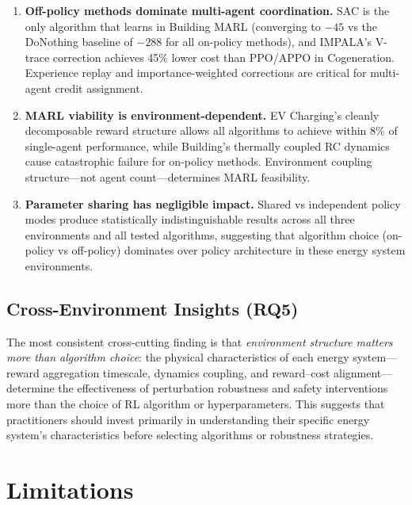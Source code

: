 \begin{enumerate}
    \item \textbf{Off-policy methods dominate multi-agent coordination.} SAC is the only algorithm that learns in Building MARL (converging to $-45$ vs the DoNothing baseline of $-288$ for all on-policy methods), and IMPALA's V-trace correction achieves 45\% lower cost than PPO/APPO in Cogeneration. Experience replay and importance-weighted corrections are critical for multi-agent credit assignment.

    \item \textbf{MARL viability is environment-dependent.} EV Charging's cleanly decomposable reward structure allows all algorithms to achieve within 8\% of single-agent performance, while Building's thermally coupled RC dynamics cause catastrophic failure for on-policy methods. Environment coupling structure---not agent count---determines MARL feasibility.

    \item \textbf{Parameter sharing has negligible impact.} Shared vs independent policy modes produce statistically indistinguishable results across all three environments and all tested algorithms, suggesting that algorithm choice (on-policy vs off-policy) dominates over policy architecture in these energy system environments.
\end{enumerate}

\subsection{Cross-Environment Insights (RQ5)}

The most consistent cross-cutting finding is that \emph{environment structure matters more than algorithm choice}: the physical characteristics of each energy system---reward aggregation timescale, dynamics coupling, and reward--cost alignment---determine the effectiveness of perturbation robustness and safety interventions more than the choice of RL algorithm or hyperparameters. This suggests that practitioners should invest primarily in understanding their specific energy system's characteristics before selecting algorithms or robustness strategies.

\section{Limitations}
\label{sec:limitations}

